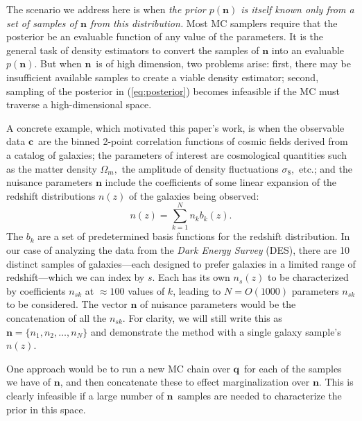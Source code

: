 \documentclass[linenumbers, onecolumn]{aastex63}
\newcommand{\vecc}{\ensuremath{\mathbf{c}}}
\newcommand{\vecq}{\ensuremath{\mathbf{q}}}
\newcommand{\vecn}{\ensuremath{\mathbf{n}}}
\begin{document}
The scenario we address here is when \emph{the prior $p(\vecn)$ is
  itself known only from a set of samples of $\vecn$ from this
  distribution.} Most MC samplers require that the posterior be an
evaluable function of any value of the parameters. It is the general task of density estimators to convert the samples of $\vecn$ into an evaluable $p(\vecn).$  But when \vecn\ is of high dimension, two problems arise: first, there may be insufficient available samples to create a viable density estimator; second, sampling of the posterior in (\ref{eq:posterior}) becomes infeasible if the MC must traverse a high-dimensional space.

A concrete example, which motivated this paper's work,
is when the observable data \vecc\ are the binned 2-point correlation functions of
cosmic fields derived from a catalog of galaxies; the parameters of
interest are cosmological quantities such as the  matter density
$\Omega_m,$ the amplitude of density fluctuations $\sigma_8,$
etc.; and the nuisance parameters $\vecn$
include the coefficients of some linear expansion of the redshift distributions $n(z)$ of the galaxies being observed:
\begin{equation}
  n(z) = \sum_{k=1}^{N} n_k b_k(z).
  \label{eq:nzbasis}
\end{equation}
The $b_k$ are a set of predetermined basis functions for the redshift
distribution.  In our case of analyzing the data from the  \textit{Dark Energy Survey} (DES), there are 10 distinct samples of galaxies---each designed to prefer galaxies in a limited range of redshift---which we can index by $s.$ Each has its own $n_s(z)$ to be characterized by coefficients $n_{sk}$ at $\approx100$ values of $k$, leading to $N=O(1000)$ parameters $n_{sk}$ to be considered.  The vector $\vecn$ of nuisance parameters would be the concatenation of all the $n_{sk}.$ For clarity, we will still write this as $\vecn=\{n_1,n_2,\ldots,n_N\}$ and demonstrate the method with a single galaxy sample's $n(z)$.

One approach would be to run a new MC chain over \vecq\ for each of the samples we have of \vecn, and then concatenate these to effect marginalization over \vecn.  This is clearly infeasible if a large number of \vecn\ samples are needed to characterize the prior in this space.
\end{document}
